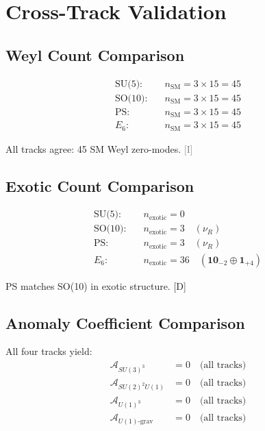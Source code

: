 \documentclass[11pt,a4paper]{article}
\newcommand{\tagD}{\textcolor{blue!70!black}{[D]}}
\newcommand{\tagI}{\textcolor{gray}{[I]}}
\begin{document}
\section{Cross-Track Validation}
\label{app:cross}

\subsection{Weyl Count Comparison}

\begin{align}
\label{eq:weyl-su5}
\text{SU(5):} \quad & n_{\text{SM}} = 3 \times 15 = 45 \\
\label{eq:weyl-so10}
\text{SO(10):} \quad & n_{\text{SM}} = 3 \times 15 = 45 \\
\label{eq:weyl-ps}
\text{PS:} \quad & n_{\text{SM}} = 3 \times 15 = 45 \\
\label{eq:weyl-e6}
E_6: \quad & n_{\text{SM}} = 3 \times 15 = 45
\end{align}

All tracks agree: 45 SM Weyl zero-modes. \tagI

\subsection{Exotic Count Comparison}

\begin{align}
\label{eq:exotic-su5}
\text{SU(5):} \quad & n_{\text{exotic}} = 0 \\
\label{eq:exotic-so10}
\text{SO(10):} \quad & n_{\text{exotic}} = 3 \quad (\nu_R) \\
\label{eq:exotic-ps}
\text{PS:} \quad & n_{\text{exotic}} = 3 \quad (\nu_R) \\
\label{eq:exotic-e6}
E_6: \quad & n_{\text{exotic}} = 36 \quad (\mathbf{10}_{-2} \oplus \mathbf{1}_{+4})
\end{align}

PS matches SO(10) in exotic structure. \tagD

\subsection{Anomaly Coefficient Comparison}

All four tracks yield:
\begin{align}
\label{eq:anom-compare-su3}
\mathcal{A}_{SU(3)^3} &= 0 \quad \text{(all tracks)} \\
\label{eq:anom-compare-su2}
\mathcal{A}_{SU(2)^2 U(1)} &= 0 \quad \text{(all tracks)} \\
\label{eq:anom-compare-u1-3}
\mathcal{A}_{U(1)^3} &= 0 \quad \text{(all tracks)} \\
\label{eq:anom-compare-grav}
\mathcal{A}_{U(1)\text{-grav}} &= 0 \quad \text{(all tracks)}
\end{align}
\end{document}
